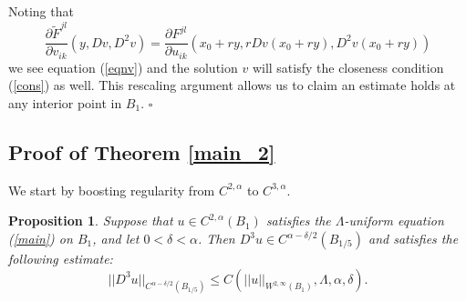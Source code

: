 \documentclass[12pt,leqno]{amsart}%
\theoremstyle{plain}
\newtheorem{proposition}{Proposition}[section]
\numberwithin{equation}{section}
\theoremstyle{definition}
\begin{document}
Noting that 
\[
\frac{\partial \tilde{F}^{jl}}{\partial v_{ik}}(y,Dv,D^{2}v)=\frac{\partial F^{jl}%
}{\partial u_{ik}}(x_{0}+ry,rDv(x_{0}+ry),D^{2}v(x_{0}+ry))
\]
we see equation (\ref{eqnv}) and the solution $v$ will  satisfy the closeness condition (\ref{cons}) as well.  This rescaling argument allows us to claim an estimate holds at any interior point in $B_{1}.$    \hfill $\square$


\subsection{Proof of Theorem \ref{main_2}}

We start by boosting regularity from $C^{2,\alpha}$ to $C^{3,\alpha}$.

\begin{proposition}
\label{reg1} Suppose that $u\in C^{2,\alpha}(B_{1})$ satisfies the $\Lambda
$-uniform equation (\ref{main}) on $B_{1}$, and let $0<\delta< \alpha$. Then
$D^{3}u\in C^{\alpha-\delta/2}(B_{1/5})$ and satisfies the following
estimate:
\begin{equation}
||D^{3}u||_{C^{\alpha-\delta/2}(B_{1/5})}\leq C(||u||_{W^{2,\infty}(B_{1}%
)},\Lambda,\alpha,\delta). \label{er}%
\end{equation}

\end{proposition}
\end{document}

